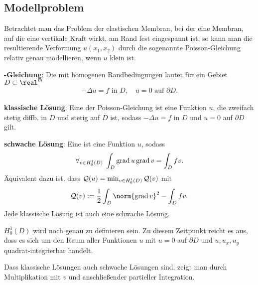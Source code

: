 \subsection{%
    Modellproblem%
}

Betrachtet man das Problem der elastischen Membran, bei der eine Membran, auf die eine vertikale
Kraft wirkt, am Rand fest eingespannt ist, so kann man die resultierende Verformung $u(x_1, x_2)$
durch die sogenannte Poisson-Gleichung relativ genau modellieren, wenn $u$ klein ist.

\textbf{-Gleichung}:
Die  mit homogenen Randbedingungen lautet
für ein Gebiet $D \subset \real^m$
\begin{align*}
    -\Delta u = f \text{ in } D,\quad
    u = 0 \text{ auf } \partial D.
\end{align*}

\textbf{klassische Lösung}:
Eine  der Poisson-Gleichung ist eine Funktion $u$, die zweifach stetig
diffb. in $D$ und stetig auf $\overline{D}$ ist, sodass $-\Delta u = f$ in $D$ und $u = 0$ auf
$\partial D$ gilt.

\textbf{schwache Lösung}:
Eine  ist eine Funktion $u$, sodass
\begin{align*}
    \forall_{v \in H_0^1(D)}\; \int_D \operatorname{grad} u \operatorname{grad} v = \int_D fv.
\end{align*}
Äquivalent dazu ist, dass $\mathcal{Q}(u) = \min_{v \in H_0^1(D)} \mathcal{Q}(v)$ mit
\begin{align*}
    \Q(v) := \frac{1}{2} \int_D \norm{\grad v}^2 - \int_D fv.
\end{align*}
Jede klassische Lösung ist auch eine schwache Lösung.

$H_0^1(D)$ wird noch genau zu definieren sein.
Zu diesem Zeitpunkt reicht es aus, dass es sich um den Raum aller Funktionen $u$ mit $u = 0$ auf
$\partial D$ und $u, u_x, u_y$ quadrat-integrierbar handelt.

\linie

Dass klassische Lösungen auch schwache Lösungen sind, zeigt man
durch Multiplikation mit $v$ und anschließender partieller Integration.


